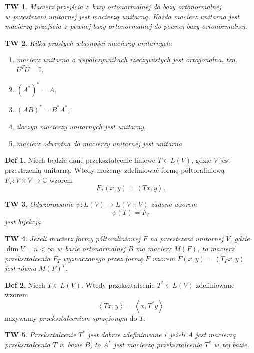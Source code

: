 \documentclass[a4paper, 12pt]{mwart}
\newcommand*{\im}{\mathrm{I}}
\theoremstyle{definition}
\newtheorem{definicja}{Def}[section]
\theoremstyle{plain}
\newtheorem{twierdzenie}{TW}[section]
\theoremstyle{remark}
\begin{document}
\begin{twierdzenie}
	Macierz przejścia z~bazy ortonormalnej do bazy ortonormalnej w~przestrzeni unitarnej jest macierzą unitarną. Każda macierz unitarna jest macierzą przejścia z~pewnej bazy ortonormalnej do pewnej bazy ortonormalnej.
\end{twierdzenie}
\begin{twierdzenie}
	Kilka prostych własności macierzy unitarnych:
	\begin{enumerate}
		\item macierz unitarna o współczynnikach rzeczywistych jest ortogonalna, tzn. $U^TU = \im$,
		\item ${\left(A^*\right)}^* = A$,
		\item ${\left(AB\right)}^* = B^*A^*$,
		\item iloczyn macierzy unitarnych jest unitarny,
		\item macierz odwrotna do macierzy unitarnej jest unitarna.
	\end{enumerate}
\end{twierdzenie}
\begin{definicja}
	Niech będzie dane przekształcenie liniowe $T \in L(V)$, gdzie $V$ jest przestrzenią unitarną. Wtedy możemy zdefiniować formę półtoraliniową $F_T\colon V\times V\to \mathbb{C}$ wzorem
	\begin{equation}
		F_T(x, y) = \left<Tx, y\right>.
	\end{equation}
\end{definicja}
\begin{twierdzenie}
	Odwzorowanie $\psi\colon L(V)\to L(V\times V)$ zadane wzorem
	\begin{equation}
		\psi(T) = F_T
	\end{equation}
	jest bijekcją.
\end{twierdzenie}
\begin{twierdzenie}
	Jeżeli macierz formy półtoraliniowej $F$ na przestrzeni unitarnej $V$, gdzie $\dim V = n <\infty$ w~bazie ortonormalnej $B$ ma macierz $M(F)$, to macierz przekształcenia $F_T$ wyznaczonego przez formę $F$ wzorem $F(x, y) = \left<T_F x, y\right>$ jest równa ${M(F)}^T$. %
\end{twierdzenie}
\begin{definicja}
	Niech $T\in L(V)$. Wtedy przekształcenie $T^*\in L(V)$ zdefiniowane wzorem
	\begin{equation}
		\left<Tx, y\right> = \left<x, T^*y\right>
	\end{equation}
	nazywamy \emph{przekształceniem sprzężonym} do $T$.
\end{definicja}
\begin{twierdzenie}
	Przekształcenie $T^*$ jest dobrze zdefiniowane i~jeżeli $A$ jest macierzą przekształcenia $T$ w~bazie $B$, to $A^*$ jest macierzą przekształcenia $T^*$ w~tej bazie.
\end{twierdzenie}
\end{document}
